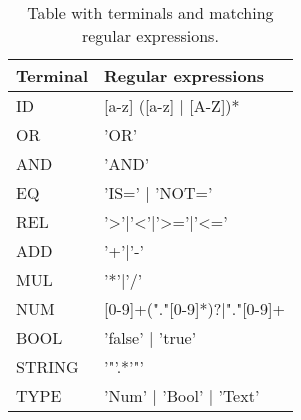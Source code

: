 \begin{table}[]
\centering
\label{fig:Lexicon}
\begin{tabular}{|l|l|}
\hline
Terminal & Regular expressions                \\ \hline
ID       & {[}a-z{]} ({[}a-z{]} | {[}A-Z{]})* \\ \hline
OR		 & 'OR'								  \\ \hline
AND		 & 'AND'							  \\ \hline
EQ		 & 'IS=' | 'NOT='					  \\ \hline
REL		 & '>'|'<'|'>='|'<='					  \\ \hline
ADD		 & '+'|'-'							  \\ \hline
MUL		 & '*'|'/'							  \\ \hline
NUM		 & [0-9]+("."[0-9]*)?|"."[0-9]+		  \\ \hline
BOOL 	 & 'false' | 'true'					  \\ \hline
STRING 	 & '"'.*'"'						      \\ \hline
TYPE     & 'Num' | 'Bool' | 'Text'            \\ \hline


\end{tabular}
\caption{Table with terminals and matching regular expressions.}
\end{table}
